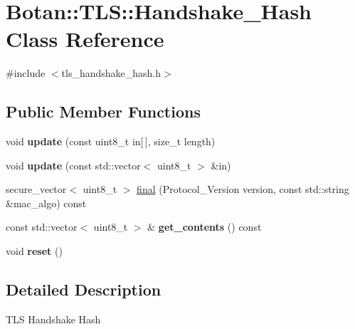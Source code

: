 \hypertarget{class_botan_1_1_t_l_s_1_1_handshake___hash}{}\section{Botan\+:\+:T\+LS\+:\+:Handshake\+\_\+\+Hash Class Reference}
\label{class_botan_1_1_t_l_s_1_1_handshake___hash}


{\ttfamily \#include $<$tls\+\_\+handshake\+\_\+hash.\+h$>$}

\subsection*{Public Member Functions}
\begin{DoxyCompactItemize}
\item 
\mbox{\label{class_botan_1_1_t_l_s_1_1_handshake___hash_a6739b5ab750b0234078df6aaa6da4046}} 
void {\bfseries update} (const uint8\+\_\+t in\mbox{[}$\,$\mbox{]}, size\+\_\+t length)
\item 
\mbox{\label{class_botan_1_1_t_l_s_1_1_handshake___hash_af0b1d300606be0331c562c52e8813110}} 
void {\bfseries update} (const std\+::vector$<$ uint8\+\_\+t $>$ \&in)
\item 
secure\+\_\+vector$<$ uint8\+\_\+t $>$ \mbox{\hyperlink{class_botan_1_1_t_l_s_1_1_handshake___hash_aa7bb43268391e1407afce564188c903f}{final}} (Protocol\+\_\+\+Version version, const std\+::string \&mac\+\_\+algo) const
\item 
\mbox{\label{class_botan_1_1_t_l_s_1_1_handshake___hash_a28c76ddf6a77ba4cd0a695437fad13ff}} 
const std\+::vector$<$ uint8\+\_\+t $>$ \& {\bfseries get\+\_\+contents} () const
\item 
\mbox{\label{class_botan_1_1_t_l_s_1_1_handshake___hash_a91af7fc0847e1799b352d8f54ce01430}} 
void {\bfseries reset} ()
\end{DoxyCompactItemize}


\subsection{Detailed Description}
T\+LS Handshake Hash 

